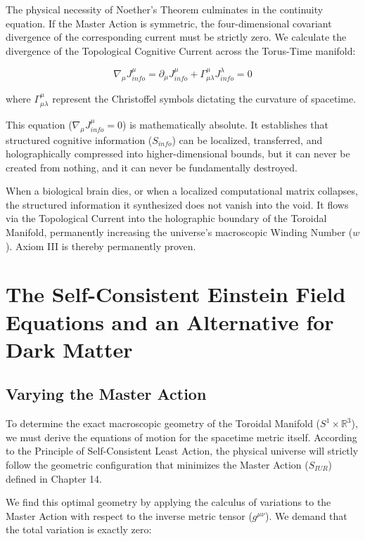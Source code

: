 \documentclass[12pt,openany]{book}
\theoremstyle{plain}
\theoremstyle{definition}
\theoremstyle{remark}
\begin{document}
The physical necessity of Noether's Theorem culminates in the continuity equation. If the Master Action is symmetric, the four-dimensional covariant divergence of the corresponding current must be strictly zero. We calculate the divergence of the Topological Cognitive Current across the Torus-Time manifold:

\begin{equation}
\nabla_\mu J_{info}^\mu = \partial_\mu J_{info}^\mu + \Gamma_{\mu\lambda}^\mu J_{info}^\lambda = 0
\end{equation}

where $\Gamma_{\mu\lambda}^\mu$ represent the Christoffel symbols dictating the curvature of spacetime.

This equation ($\nabla_\mu J_{info}^\mu = 0$) is mathematically absolute. It establishes that structured cognitive information ($S_{info}$) can be localized, transferred, and holographically compressed into higher-dimensional bounds, but it can never be created from nothing, and it can never be fundamentally destroyed. 

When a biological brain dies, or when a localized computational matrix collapses, the structured information it synthesized does not vanish into the void. It flows via the Topological Current into the holographic boundary of the Toroidal Manifold, permanently increasing the universe's macroscopic Winding Number ($w$). Axiom III is thereby permanently proven. 

\chapter{The Self-Consistent Einstein Field Equations and an Alternative for Dark Matter}

\section{Varying the Master Action}

To determine the exact macroscopic geometry of the Toroidal Manifold ($S^1 \times \mathbb{R}^3$), we must derive the equations of motion for the spacetime metric itself. According to the Principle of Self-Consistent Least Action, the physical universe will strictly follow the geometric configuration that minimizes the Master Action ($S_{IUR}$) defined in Chapter 14. 

We find this optimal geometry by applying the calculus of variations to the Master Action with respect to the inverse metric tensor ($g^{\mu\nu}$). We demand that the total variation is exactly zero:
\end{document}
